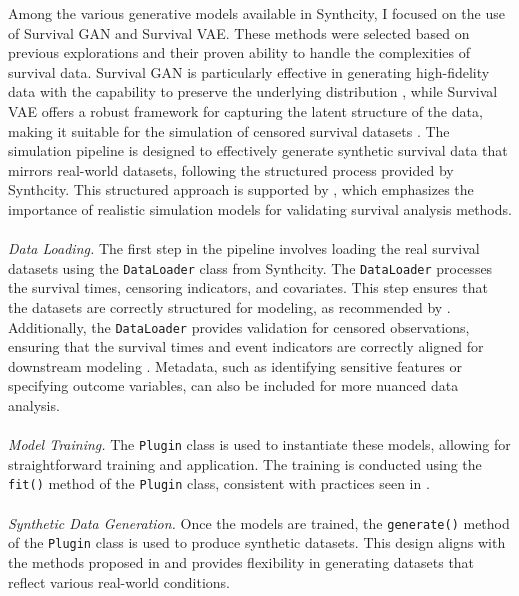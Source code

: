 \noindent Among the various generative models available in Synthcity, I focused on the use of Survival GAN and Survival VAE. These methods were selected based on previous explorations and their proven ability to handle the complexities of survival data. Survival GAN is particularly effective in generating high-fidelity data with the capability to preserve the underlying distribution \parencite{norcliffe_survivalgan_2023}, while Survival VAE offers a robust framework for capturing the latent structure of the data, making it suitable for the simulation of censored survival datasets \parencite{qi_survivaleval_2024}.
The simulation pipeline is designed to effectively generate synthetic survival data that mirrors real-world datasets, following the structured process provided by Synthcity. This structured approach is supported by \parencite{morris_using_2019}, which emphasizes the importance of realistic simulation models for validating survival analysis methods. 
\\\\
\noindent \textit{Data Loading.} \parencite{qian_synthcity_2023} The first step in the pipeline involves loading the real survival datasets using the \texttt{DataLoader} class from Synthcity. The \texttt{DataLoader} processes the survival times, censoring indicators, and covariates. This step ensures that the datasets are correctly structured for modeling, as recommended by \parencite{kalbfleisch_fifty_2023}. Additionally, the \texttt{DataLoader} provides validation for censored observations, ensuring that the survival times and event indicators are correctly aligned for downstream modeling \parencite{ichida_evaluation_1993}. Metadata, such as identifying sensitive features or specifying outcome variables, can also be included for more nuanced data analysis.
\\\\
\noindent \textit{Model Training.} The \texttt{Plugin} class is used to instantiate these models, allowing for straightforward training and application. The training is conducted using the \texttt{fit()} method of the \texttt{Plugin} class, consistent with practices seen in \parencite{ishwaran_random_2008}.
\\\\
\noindent \textit{Synthetic Data Generation.} Once the models are trained, the \texttt{generate()} method of the \texttt{Plugin} class is used to produce synthetic datasets. This design aligns with the methods proposed in \parencite{thurow_how_2023} and provides flexibility in generating datasets that reflect various real-world conditions.
